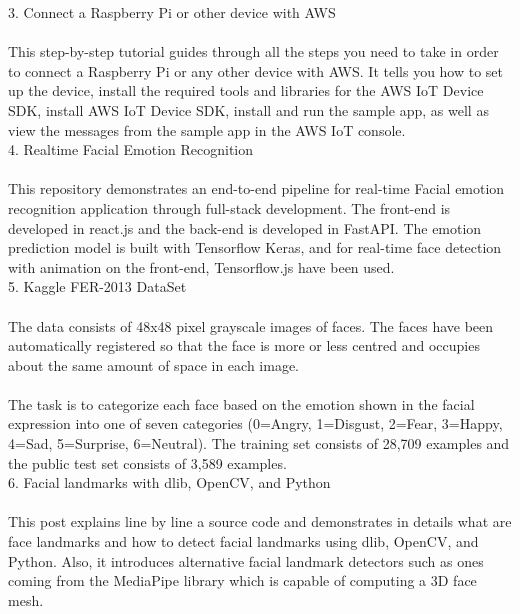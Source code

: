 \begin{itemize}
    3. Connect a Raspberry Pi or other device with AWS\cite{r17} \\
    \\This step-by-step tutorial guides through all the steps you need to take in order to connect a Raspberry Pi or any other device with AWS. It tells you how to set up the device, install the required tools and libraries for the AWS IoT Device SDK, install AWS IoT Device SDK, install and run the sample app, as well as view the messages from the sample app in the AWS IoT console.\\

    4. Realtime Facial Emotion Recognition\cite{r18} \\
    \\This repository demonstrates an end-to-end pipeline for real-time Facial emotion recognition application through full-stack development. The front-end is developed in react.js and the back-end is developed in FastAPI. The emotion prediction model is built with Tensorflow Keras, and for real-time face detection with animation on the front-end, Tensorflow.js have been used.\\

    5. Kaggle FER-2013 DataSet\cite{r19} \\
    \\The data consists of 48x48 pixel grayscale images of faces. The faces have been automatically registered so that the face is more or less centred and occupies about the same amount of space in each image.\\ \\The task is to categorize each face based on the emotion shown in the facial expression into one of seven categories (0=Angry, 1=Disgust, 2=Fear, 3=Happy, 4=Sad, 5=Surprise, 6=Neutral). The training set consists of 28,709 examples and the public test set consists of 3,589 examples.\\

    6. Facial landmarks with dlib, OpenCV, and Python\cite{r20} \\
    \\This post explains line by line a source code and demonstrates in details what are face landmarks and how to detect facial landmarks using dlib, OpenCV, and Python. Also, it introduces alternative facial landmark detectors such as ones coming from the MediaPipe library which is capable of computing a 3D face mesh.\\
\end{itemize}